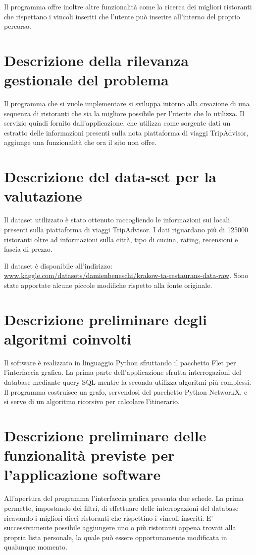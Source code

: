 \documentclass{report}
\begin{document}
Il programma offre inoltre altre funzionalità come la ricerca dei migliori ristoranti che rispettano i vincoli inseriti che l'utente può inserire all'interno del proprio percorso.

\section{Descrizione della rilevanza gestionale del problema}\label{sec_rilevanza}
Il programma che si vuole implementare si sviluppa intorno alla creazione di una sequenza di ristoranti che sia la migliore possibile per l'utente che lo utilizza. Il servizio quindi fornito dall'applicazione, che utilizza come sorgente dati un estratto delle informazioni presenti sulla nota piattaforma di viaggi TripAdvisor, aggiunge una funzionalità che ora il sito non offre.  

\section{Descrizione del data-set per la valutazione}
Il dataset utilizzato è stato ottenuto raccogliendo le informazioni sui locali presenti sulla piattaforma di viaggi TripAdvisor. I dati riguardano più di 125000 ristoranti oltre ad informazioni sulla città, tipo di cucina, rating, recensioni e fascia di prezzo.

Il dataset è disponibile all'indirizzo: \url{www.kaggle.com/datasets/damienbeneschi/krakow-ta-restaurans-data-raw}.
Sono state apportate alcune piccole modifiche rispetto alla fonte originale.

\section{Descrizione preliminare degli algoritmi coinvolti}\label{sec_algoritmi}
Il software è realizzato in linguaggio Python sfruttando il pacchetto Flet per l'interfaccia grafica.
La prima parte dell'applicazione sfrutta interrogazioni del database mediante query SQL mentre la seconda utilizza algoritmi più complessi. Il programma costruisce un grafo, servendosi del pacchetto Python NetworkX, e si serve di un algoritmo ricorsivo per calcolare l'itinerario.

\section{Descrizione preliminare delle funzionalità previste per l’applicazione software}\label{sec_funzionalità}
All'apertura del programma l'interfaccia grafica presenta due schede. 
La prima permette, impostando dei filtri, di effettuare delle interrogazioni del database ricavando i migliori dieci ristoranti che rispettino i vincoli inseriti. 
E' successivamente possibile aggiungere uno o più ristoranti appena trovati alla propria lista personale, la quale può essere opportunamente modificata in qualunque momento.
\end{document}
